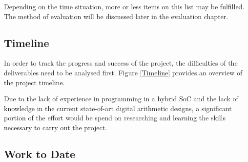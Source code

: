 Depending on the time situation, more or less items on this list may be fulfilled.
The method of evaluation will be discussed later in the evaluation chapter.

\subsection{Timeline}
\begin{figure*}
  \centering
  
  \caption{Project Timeline}
  \label{Timeline}
\end{figure*}

In order to track the progress and success of the project, the difficulties
of the deliverables need to be analysed first.
Figure \ref{Timeline} provides an overview of the project timeline.

Due to the lack of experience in programming in a hybrid SoC and the lack of
knowledge in the current state-of-art digital arithmetic designs, a significant
portion of the effort would be spend on researching and learning the skills
necessary to carry out the project.

\subsection{Work to Date}
